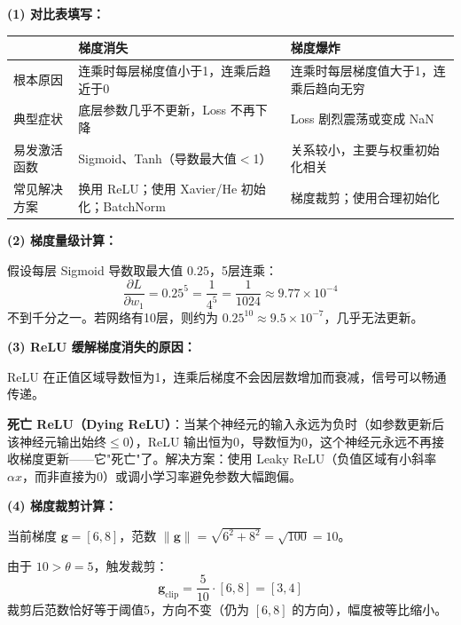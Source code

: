 \documentclass[a4paper,11pt]{ctexart}
\begin{document}
\begin{solutionbox}[参考答案与详细解析]
    \textbf{(1) 对比表填写：}

    \begin{center}
    \begin{tabular}{p{2.5cm} p{4.5cm} p{4.5cm}}
        \toprule
        & \textbf{梯度消失} & \textbf{梯度爆炸} \\
        \midrule
        根本原因 & 连乘时每层梯度值小于1，连乘后趋近于0 & 连乘时每层梯度值大于1，连乘后趋向无穷 \\[1em]
        典型症状 & 底层参数几乎不更新，Loss 不再下降 & Loss 剧烈震荡或变成 NaN \\[1em]
        易发激活函数 & Sigmoid、Tanh（导数最大值$<$1） & 关系较小，主要与权重初始化相关 \\[1em]
        常见解决方案 & 换用 ReLU；使用 Xavier/He 初始化；BatchNorm & 梯度裁剪；使用合理初始化 \\
        \bottomrule
    \end{tabular}
    \end{center}

    \textbf{(2) 梯度量级计算：}

    假设每层 Sigmoid 导数取最大值 $0.25$，5层连乘：
    \[
    \frac{\partial L}{\partial w_1} = 0.25^5 = \frac{1}{4^5} = \frac{1}{1024} \approx \boxed{9.77 \times 10^{-4}}
    \]
    不到千分之一。若网络有10层，则约为 $0.25^{10} \approx 9.5 \times 10^{-7}$，几乎无法更新。

    \textbf{(3) ReLU 缓解梯度消失的原因：}

    ReLU 在正值区域导数恒为1，连乘后梯度不会因层数增加而衰减，信号可以畅通传递。

    \textbf{死亡 ReLU（Dying ReLU）}：当某个神经元的输入永远为负时（如参数更新后该神经元输出始终$\leq 0$），ReLU 输出恒为0，导数恒为0，这个神经元永远不再接收梯度更新——它"死亡"了。解决方案：使用 Leaky ReLU（负值区域有小斜率 $\alpha x$，而非直接为0）或调小学习率避免参数大幅跑偏。

    \textbf{(4) 梯度裁剪计算：}

    当前梯度 $\mathbf{g} = [6, 8]$，范数 $\|\mathbf{g}\| = \sqrt{6^2 + 8^2} = \sqrt{100} = 10$。

    由于 $10 > \theta = 5$，触发裁剪：
    \[
    \mathbf{g}_{\text{clip}} = \frac{5}{10} \cdot [6, 8] = \boxed{[3, 4]}
    \]
    裁剪后范数恰好等于阈值5，方向不变（仍为 $[6,8]$ 的方向），幅度被等比缩小。
\end{solutionbox}
\end{document}
